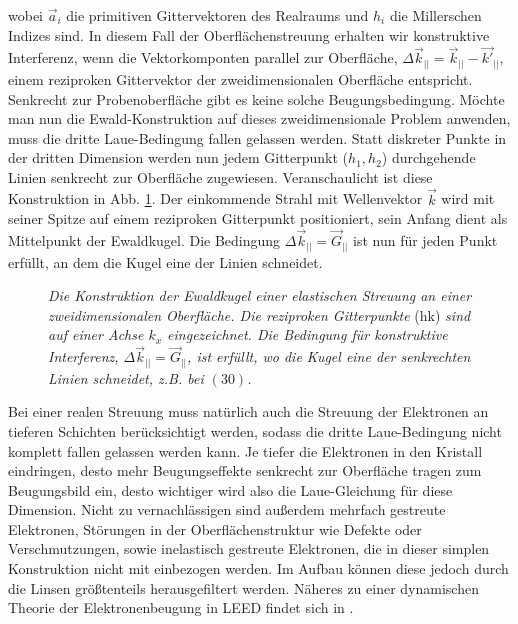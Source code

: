 wobei $\vec{a}_i$ die primitiven Gittervektoren des Realraums und $h_i$ die Millerschen Indizes
sind. In diesem Fall der Oberflächenstreuung erhalten wir konstruktive Interferenz,
wenn die Vektorkomponten parallel zur Oberfläche, $\Delta\vec{k}_{||}=\vec{k}_{||}-\vec{k'}_{||}$,
einem reziproken Gittervektor der zweidimensionalen Oberfläche entspricht. Senkrecht zur Probenoberfläche
gibt es keine solche Beugungsbedingung. Möchte man nun die Ewald-Konstruktion auf dieses
zweidimensionale Problem anwenden, muss die dritte Laue-Bedingung fallen gelassen werden. Statt
diskreter Punkte in der dritten Dimension werden nun jedem Gitterpunkt ($h_1, h_2$) durchgehende
Linien senkrecht zur Oberfläche zugewiesen. Veranschaulicht ist diese Konstruktion in Abb.
\ref{ewald}. Der einkommende Strahl mit Wellenvektor $\vec{k}$ wird mit seiner Spitze auf einem
reziproken Gitterpunkt positioniert, sein Anfang dient als Mittelpunkt der Ewaldkugel. Die
Bedingung $\Delta \vec{k}_{||}=\vec{G}_{||}$ ist nun für jeden Punkt erfüllt, an dem die Kugel eine
der Linien schneidet. 
\begin{figure}[H]
\centering
\sffamily 

\caption{\textit{Die Konstruktion der Ewaldkugel einer elastischen Streuung an einer
zweidimensionalen Oberfläche. Die reziproken Gitterpunkte} (hk) \textit{sind auf einer Achse $k_x$
eingezeichnet. Die Bedingung für konstruktive Interferenz, $\Delta \vec{k}_{||}=\vec{G}_{||}$,  ist erfüllt, wo die Kugel eine der senkrechten Linien
schneidet, z.B. bei $(30)$. }}
\label{ewald}
\end{figure}




Bei einer realen Streuung muss natürlich auch die Streuung der Elektronen an tieferen
Schichten berücksichtigt werden, sodass die dritte Laue-Bedingung nicht komplett fallen gelassen werden
kann. Je tiefer die Elektronen in den Kristall eindringen, desto mehr Beugungseffekte senkrecht zur
Oberfläche tragen zum Beugungsbild ein, desto wichtiger wird also die Laue-Gleichung für diese
Dimension. Nicht zu vernachlässigen sind außerdem mehrfach gestreute Elektronen, Störungen in der
Oberflächenstruktur wie Defekte oder Verschmutzungen, sowie inelastisch gestreute Elektronen, die in
dieser simplen Konstruktion nicht mit einbezogen werden. Im Aufbau können diese jedoch durch die
Linsen größtenteils herausgefiltert werden. Näheres zu einer dynamischen Theorie der
Elektronenbeugung in LEED findet sich in \cite{Lueth}.

\FloatBarrier










